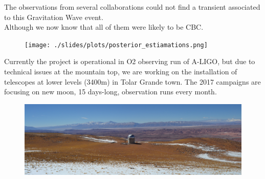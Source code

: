 \documentclass[10pt]{beamer}
\begin{document}
\begin{frame}
 The observations from several collaborations could not find
 a transient associated to this Gravitation Wave event.\\
 
Although we now know that all of them were likely to be CBC.
\begin{figure}
 \centering
 \texttt{[image: ./slides/plots/posterior\_estiamations.png]}
 \label{fig:posterior}
\end{figure}

\end{frame}

\begin{frame}
Currently the project is operational in O2 observing run of A-LIGO, but
due to technical issues at the mountain top, we are working on the installation 
of telescopes at lower levels (3400m) in Tolar Grande town.
\pause
The 2017 campaigns are focusing on new moon, 15 days-long, observation
runs every month. 

\begin{figure}
 \centering
 \includegraphics[width=1.\textwidth]{./slides/plots/macon.png}
\end{figure}

\end{frame}
\end{document}
